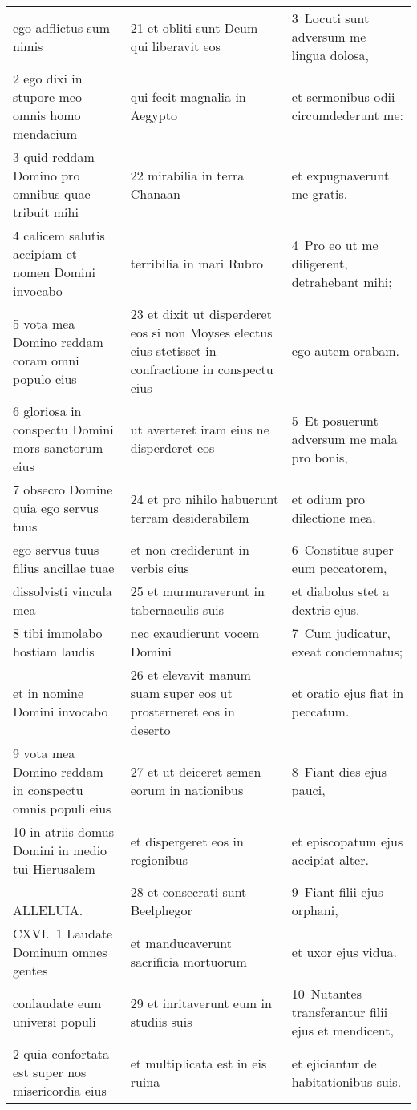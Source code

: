 \documentclass{article}
\begin{document}
\begin{longtable}{@{}p{}p{}p{}@{}}
ego adflictus sum nimis	&	21 et obliti sunt Deum qui liberavit eos	&	3 Locuti sunt adversum me lingua dolosa,	\\
2 ego dixi in stupore meo omnis homo mendacium	&	qui fecit magnalia in Aegypto	&	et sermonibus odii circumdederunt me:	\\
3 quid reddam Domino pro omnibus quae tribuit mihi	&	22 mirabilia in terra Chanaan	&	et expugnaverunt me gratis.	\\
4 calicem salutis accipiam et nomen Domini invocabo	&	terribilia in mari Rubro	&	4 Pro eo ut me diligerent, detrahebant mihi;	\\
5 vota mea Domino reddam coram omni populo eius	&	23 et dixit ut disperderet eos si non Moyses electus eius stetisset in confractione in conspectu eius	&	ego autem orabam.	\\
6 gloriosa in conspectu Domini mors sanctorum eius	&	ut averteret iram eius ne disperderet eos	&	5 Et posuerunt adversum me mala pro bonis,	\\
7 obsecro Domine quia ego servus tuus	&	24 et pro nihilo habuerunt terram desiderabilem	&	et odium pro dilectione mea.	\\
ego servus tuus filius ancillae tuae	&	et non crediderunt in verbis eius	&	6 Constitue super eum peccatorem,	\\
dissolvisti vincula mea	&	25 et murmuraverunt in tabernaculis suis	&	et diabolus stet a dextris ejus.	\\
8 tibi immolabo hostiam laudis	&	nec exaudierunt vocem Domini	&	7 Cum judicatur, exeat condemnatus;	\\
et in nomine Domini invocabo	&	26 et elevavit manum suam super eos ut prosterneret eos in deserto	&	et oratio ejus fiat in peccatum.	\\
9 vota mea Domino reddam in conspectu omnis populi eius	&	27 et ut deiceret semen eorum in nationibus	&	8 Fiant dies ejus pauci,	\\
10 in atriis domus Domini in medio tui Hierusalem	&	et dispergeret eos in regionibus	&	et episcopatum ejus accipiat alter.	\\
    ALLELUIA.	&	28 et consecrati sunt Beelphegor	&	9 Fiant filii ejus orphani,	\\
CXVI. 1 Laudate Dominum omnes gentes	&	et manducaverunt sacrificia mortuorum	&	et uxor ejus vidua.	\\
conlaudate eum universi populi	&	29 et inritaverunt eum in studiis suis	&	10 Nutantes transferantur filii ejus et mendicent,	\\
2 quia confortata est super nos misericordia eius	&	et multiplicata est in eis ruina	&	et ejiciantur de habitationibus suis.	\\

\end{longtable}
\end{document}
